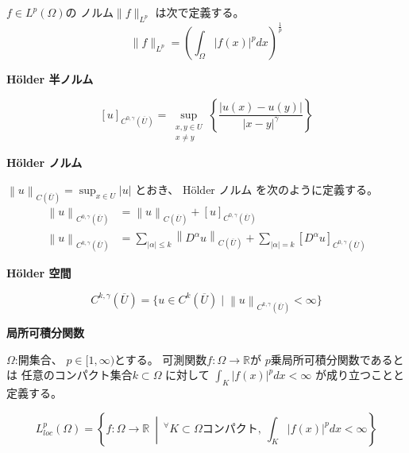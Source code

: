 \documentclass[12pt,b5paper]{ltjsarticle}
\begin{document}
$f\in L^{p}(\Omega)$の
ノルム$\| f \|_{L^{p}}$
は次で定義する。
\begin{equation}
 \| f \|_{L^{p}}
  =
  \left( \int_{\Omega} \lvert f(x) \rvert^{p} dx \right)^{\frac{1}{p}}
\end{equation}

\dotfill

\textbf{H\"{o}lder 半ノルム}

\begin{equation}
 \left[ u \right]_{C^{0,\gamma}(\overline{U})}
  =
  \sup_{\substack{x,y\in U \\ x\ne y}} \left\{ \frac{\lvert u(x)-u(y) \rvert}{\lvert x-y \rvert^{\gamma}} \right\}
\end{equation}

\dotfill

\textbf{H\"older ノルム}

$\left\| u \right\|_{C(\overline{U})} = \sup_{x\in U}\lvert u \rvert$
とおき、
H\"older ノルム
を次のように定義する。
\begin{align}
 \left\| u \right\|_{C^{0,\gamma}(\overline{U})}
  &= \left\| u \right\|_{C(\overline{U})}
  +  \left[ u \right]_{C^{0,\gamma}(\overline{U})}
 \\
 \left\| u \right\|_{C^{k,\gamma}(\overline{U})}
  &=
  \sum_{\lvert \alpha \rvert \leq k} \left\|D^{\alpha}u \right\|_{C(\overline{U})}
  + \sum_{\lvert \alpha \rvert = k} \left[ D^{\alpha}u \right]_{C^{0,\gamma}(\overline{U})}
\end{align}

\dotfill

\textbf{H\"older 空間}

\begin{equation}
 C^{k,\gamma}(\overline{U})
  =
  \{
    u \in C^{k}(\overline{U}) \mid
    \left\| u \right\|_{C^{k,\gamma}(\overline{U})} < \infty
  \}
\end{equation}

\dotfill

\textbf{局所可積分関数}

$\Omega$:開集合、
$p\in [1,\infty)$とする。
可測関数$f:\Omega\to\mathbb{R}$が
$p$乗局所可積分関数であるとは
任意のコンパクト集合$k\subset \Omega$
に対して
$\int_{K} \lvert f(x) \rvert^{p} dx < \infty$
が成り立つことと定義する。

\begin{equation}
 L^{p}_{loc}(\Omega)
  =\left\{
    f:\Omega\to \mathbb{R} %
    \:\middle|\:
    {}^{\forall}K \subset \Omega コンパクト,\:
    \int_{K} \lvert f(x) \rvert^{p} dx < \infty
   \right\}
\end{equation}
\end{document}

